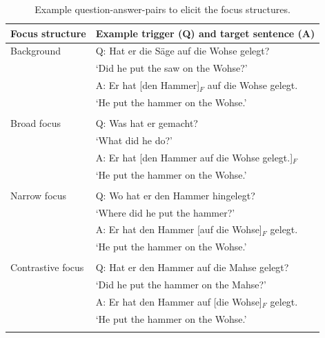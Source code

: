 \begin{table}
\caption{Example question-answer-pairs to elicit the focus structures.}
\label{tab:focus_trigger_target}
\begin{tabularx}{\textwidth}{l Q}
	\lsptoprule
Focus structure & Example trigger (Q) and target sentence (A) \\
\midrule
Background & Q: Hat er die Säge auf die Wohse gelegt? \\
& \hspace{5 mm}`Did he put the saw on the Wohse?' \\
& A: Er hat [den Hammer]$_F$ auf die Wohse gelegt. \\
& \hspace{5 mm}`He put the hammer on the Wohse.'\\
& \\
Broad focus & Q: Was hat er gemacht? \\
& \hspace{5 mm}`What did he do?' \\
& A: Er hat [den Hammer auf die Wohse gelegt.]$_F$ \\
& \hspace{5 mm}`He put the hammer on the Wohse.' \\
& \\
Narrow focus & Q: Wo hat er den Hammer hingelegt? \\
& \hspace{5 mm}`Where did he put the hammer?' \\
& A: Er hat den Hammer [auf die Wohse]$_F$ gelegt. \\
& \hspace{5 mm}`He put the hammer on the Wohse.' \\
& \\
Contrastive focus & Q: Hat er den Hammer auf die Mahse gelegt? \\
& \hspace{5 mm}`Did he put the hammer on the Mahse?' \\
& A: Er hat den Hammer auf [die Wohse]$_F$ gelegt. \\
& \hspace{5 mm}`He put the hammer on the Wohse.'\\
\lspbottomrule
\end{tabularx}
\end{table}

